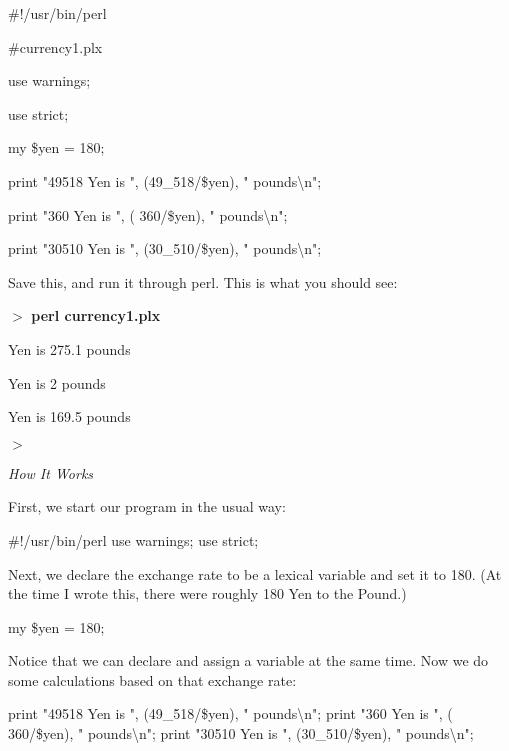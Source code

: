 \documentclass[a4paper,11pt]{book}
\begin{document}
\noindent 

\noindent \#!/usr/bin/perl

\noindent \#currency1.plx

\noindent use warnings;

\noindent use strict;

\noindent my \$yen = 180;

\noindent print "49518 Yen is ", (49\_518/\$yen), " pounds\textbackslash n";

\noindent print "360 Yen is ", ( 360/\$yen), " pounds\textbackslash n";

\noindent print "30510 Yen is ", (30\_510/\$yen), " pounds\textbackslash n";

\noindent 

\noindent Save this, and run it through perl. This is what you should see:

\noindent 

\noindent $>$ \textbf{perl currency1.plx}

 Yen is 275.1 pounds

 Yen is 2 pounds

 Yen is 169.5 pounds

\noindent $>$

\noindent 

\noindent 

\noindent \textit{How It Works}

\noindent First, we start our program in the usual way:

\noindent 

\noindent \#!/usr/bin/perl use warnings; use strict;

\noindent 

\noindent Next, we declare the exchange rate to be a lexical variable and set it to 180. (At the time I wrote this, there were roughly 180 Yen to the Pound.)

\noindent 

\noindent my \$yen = 180;

\noindent 

\noindent Notice that we can declare and assign a variable at the same time. Now we do some calculations based on that exchange rate:

\noindent 

\noindent print "49518 Yen is ", (49\_518/\$yen), " pounds\textbackslash n"; print "360 Yen is ", ( 360/\$yen), " pounds\textbackslash n"; print "30510 Yen is ", (30\_510/\$yen), " pounds\textbackslash n";
\end{document}
